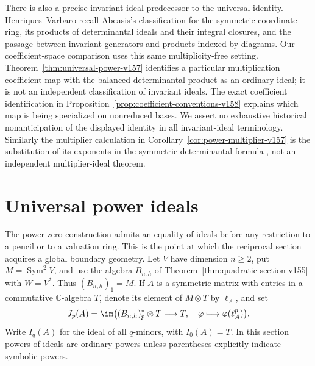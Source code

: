 \documentclass[11pt,reqno]{amsart}
\numberwithin{equation}{section}
\theoremstyle{definition}\newtheorem{definition}[theorem]{Definition}
\theoremstyle{remark}\newtheorem{remark}[theorem]{Remark}
\newcommand{\C}{\mathbb C}\newcommand{\Q}{\mathbb Q}
\DeclareMathOperator{\Sym}{Sym}\DeclareMathOperator{\Gr}{Gr}
\begin{document}
There is also a precise invariant-ideal predecessor to the universal
identity. Henriques--Varbaro \cite[\S2.4, Theorems~2.6--2.8]{HenriquesVarbaro2016}
recall Abeasis's classification for the symmetric coordinate ring,
its products of determinantal ideals and their integral closures,
and the passage between invariant generators and products indexed
by diagrams. Our coefficient-space comparison uses this same
multiplicity-free setting. Theorem~\ref{thm:universal-power-v157}
identifies a particular multiplication coefficient map with the
balanced determinantal product as an ordinary ideal; it is not
an independent classification of invariant ideals. The exact
coefficient identification in Proposition~\ref{prop:coefficient-conventions-v158}
explains which map is being specialized on nonreduced bases.
We assert no exhaustive historical nonanticipation of the displayed
identity in all invariant-ideal terminology. Similarly the
multiplier calculation in Corollary~\ref{cor:power-multiplier-v157} is the
substitution of its exponents in the symmetric determinantal formula
\cite[Theorem~4.8]{HenriquesVarbaro2016}, not an independent
multiplier-ideal theorem.



\section{Universal power ideals}
\label{sec:universal-power-v157}
The power-zero construction admits an equality of ideals before any
restriction to a pencil or to a valuation ring. This is the point at
which the reciprocal section acquires a global boundary geometry.
Let $V$ have dimension $n\geq2$, put $M=\Sym^2V$, and use the algebra
$B_{n,h}$ of Theorem~\ref{thm:quadratic-section-v155} with $W=V^*$.
Thus $(B_{n,h})_1=M$. If $A$ is a symmetric matrix with entries in a
commutative $\C$-algebra $T$, denote its element of $M\otimes T$ by
$\ell_A$, and set
\begin{equation}\label{eq:universal-power-definition-v157}
 J_p(A)=\im\bigl((B_{n,h})_p^*\otimes T\longrightarrow T,
                  \quad\varphi\longmapsto\varphi(\ell_A^p)\bigr).
\end{equation}
Write $I_q(A)$ for the ideal of all $q$-minors, with $I_0(A)=T$.
In this section powers of ideals are ordinary powers unless parentheses
explicitly indicate symbolic powers.
\end{document}
